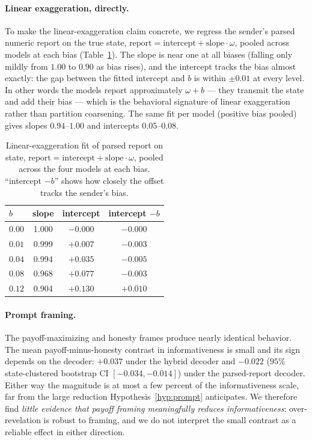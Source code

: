 \documentclass[11pt]{article}
\begin{document}
\paragraph{Linear exaggeration, directly.}
To make the linear-exaggeration claim concrete, we regress the sender's parsed numeric report on the true state, $\text{report}=\text{intercept}+\text{slope}\cdot\omega$, pooled across models at each bias (Table~\ref{tab:linexag}).  The slope is near one at all biases (falling only mildly from $1.00$ to $0.90$ as bias rises), and the intercept tracks the bias almost exactly: the gap between the fitted intercept and $b$ is within $\pm 0.01$ at every level.  In other words the models report approximately $\omega+b$ --- they transmit the state and add their bias --- which is the behavioral signature of linear exaggeration rather than partition coarsening.  The same fit per model (positive bias pooled) gives slopes $0.94$--$1.00$ and intercepts $0.05$--$0.08$.

\begin{table}[H]
\centering\small
\caption{Linear-exaggeration fit of parsed report on state, $\text{report}=\text{intercept}+\text{slope}\cdot\omega$, pooled across the four models at each bias.  ``intercept $-b$'' shows how closely the offset tracks the sender's bias.}
\label{tab:linexag}
\begin{tabular}{lccc}
\toprule
$b$ & slope & intercept & intercept $-b$ \\
\midrule
$0.00$ & 1.000 & $-0.000$ & $-0.000$ \\
$0.01$ & 0.999 & $+0.007$ & $-0.003$ \\
$0.04$ & 0.994 & $+0.035$ & $-0.005$ \\
$0.08$ & 0.968 & $+0.077$ & $-0.003$ \\
$0.12$ & 0.904 & $+0.130$ & $+0.010$ \\
\bottomrule
\end{tabular}
\end{table}

\paragraph{Prompt framing.}
The payoff-maximizing and honesty frames produce nearly identical behavior.  The mean payoff-minus-honesty contrast in informativeness is small and its sign depends on the decoder: $+0.037$ under the hybrid decoder and $-0.022$ ($95\%$ state-clustered bootstrap CI $[-0.034,-0.014]$) under the parsed-report decoder.  Either way the magnitude is at most a few percent of the informativeness scale, far from the large reduction Hypothesis~\ref{hyp:prompt} anticipates.  We therefore find \emph{little evidence that payoff framing meaningfully reduces informativeness}: over-revelation is robust to framing, and we do not interpret the small contrast as a reliable effect in either direction.
\end{document}
